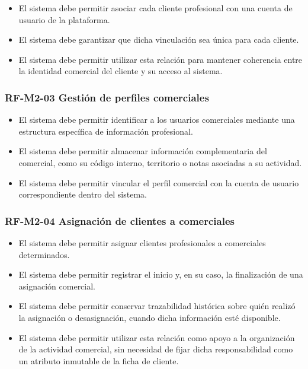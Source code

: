 \begin{itemize}
    \item El sistema debe permitir asociar cada cliente profesional con una cuenta de usuario de la plataforma.
    \item El sistema debe garantizar que dicha vinculación sea única para cada cliente.
    \item El sistema debe permitir utilizar esta relación para mantener coherencia entre la identidad comercial del cliente y su acceso al sistema.
\end{itemize}

\vspace{-0.75em}
\subsubsection{RF-M2-03 Gestión de perfiles comerciales}
\vspace{-1em}

\begin{itemize}
    \item El sistema debe permitir identificar a los usuarios comerciales mediante una estructura específica de información profesional.
    \item El sistema debe permitir almacenar información complementaria del comercial, como su código interno, territorio o notas asociadas a su actividad.
    \item El sistema debe permitir vincular el perfil comercial con la cuenta de usuario correspondiente dentro del sistema.
\end{itemize}

\vspace{-0.75em}
\subsubsection{RF-M2-04 Asignación de clientes a comerciales}
\vspace{-1em}

\begin{itemize}
    \item El sistema debe permitir asignar clientes profesionales a comerciales determinados.
    \item El sistema debe permitir registrar el inicio y, en su caso, la finalización de una asignación comercial.
    \item El sistema debe permitir conservar trazabilidad histórica sobre quién realizó la asignación o desasignación, cuando dicha información esté disponible.
    \item El sistema debe permitir utilizar esta relación como apoyo a la organización de la actividad comercial, sin necesidad de fijar dicha responsabilidad como un atributo inmutable de la ficha de cliente.
\end{itemize}

